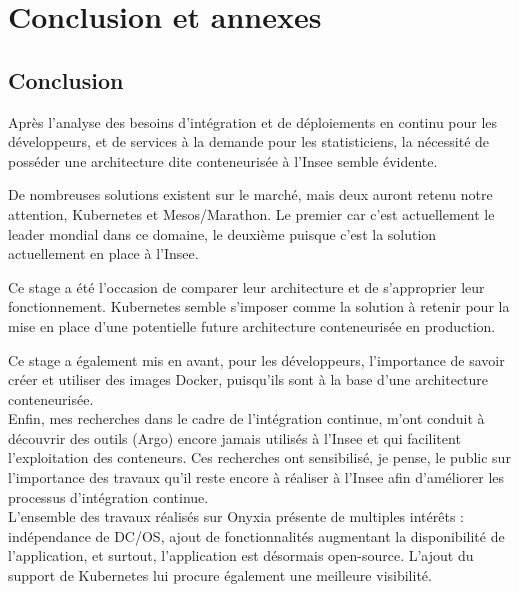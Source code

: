 \documentclass[11pt,fleqn]{book} %
\begin{document}
\part{\textcolor{ocre}{Conclusion et annexes}}
\chapter{Conclusion}
\vspace{-2cm}

Après l'analyse des besoins d'intégration et de déploiements en continu pour les développeurs, et de services à la demande pour les statisticiens, la nécessité de posséder une architecture dite conteneurisée à l'Insee semble évidente. \newline

De nombreuses solutions existent sur le marché, mais deux auront retenu notre attention, Kubernetes et Mesos/Marathon. Le premier car c'est actuellement le leader mondial dans ce domaine, le deuxième puisque c'est la solution actuellement en place à l'Insee. \newline

Ce stage a été l'occasion de comparer leur architecture et de s'approprier leur fonctionnement. Kubernetes semble s'imposer comme la solution à retenir pour la mise en place d'une potentielle future architecture conteneurisée en production.\newline

Ce stage a également mis en avant, pour les développeurs, l'importance  de savoir créer et utiliser des images Docker, puisqu'ils sont à la base d'une architecture conteneurisée.\\

Enfin, mes recherches dans le cadre de l'intégration continue, m'ont conduit à découvrir des outils (Argo) encore jamais utilisés à l'Insee et qui facilitent l'exploitation des conteneurs. Ces recherches ont sensibilisé, je pense, le public sur l'importance des travaux qu'il reste encore à réaliser à l'Insee afin d'améliorer les processus d'intégration continue.\\

L'ensemble des travaux réalisés sur Onyxia présente de multiples intérêts : indépendance de DC/OS, ajout de fonctionnalités augmentant la disponibilité de l'application, et surtout, l'application est désormais open-source. L'ajout du support de Kubernetes lui procure également une meilleure visibilité.\\
\end{document}

